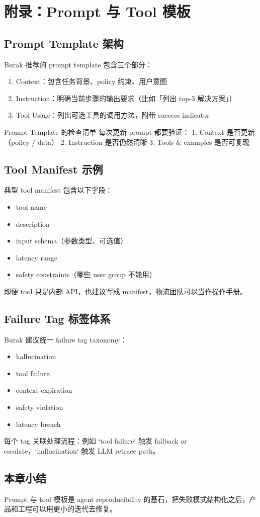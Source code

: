 \section{附录：Prompt 与 Tool 模板}

\subsection{Prompt Template 架构}

Burak 推荐的 prompt template 包含三个部分：

\begin{enumerate}
    \item Context：包含任务背景、policy 约束、用户意图
    \item Instruction：明确当前步骤的输出要求（比如「列出 top-3 解决方案」）
    \item Tool Usage：列出可选工具的调用方法，附带 success indicator
\end{enumerate}

\begin{knowledgebox}{Prompt Template 的检查清单}
每次更新 prompt 都要验证：
1. Context 是否更新（policy / data）
2. Instruction 是否仍然清晰
3. Tools \& examples 是否可复现
\end{knowledgebox}

\subsection{Tool Manifest 示例}

典型 tool manifest 包含以下字段：

\begin{itemize}
    \item tool name
    \item description
    \item input schema（参数类型、可选值）
    \item latency range
    \item safety constraints（哪些 user group 不能用）
\end{itemize}

即便 tool 只是内部 API，也建议写成 manifest，物流团队可以当作操作手册。

\subsection{Failure Tag 标签体系}

Burak 建议统一 failure tag taxonomy：

\begin{itemize}
    \item hallucination
    \item tool failure
    \item context expiration
    \item safety violation
    \item latency breach
\end{itemize}

每个 tag 关联处理流程：例如 `tool failure` 触发 fallback or escalate，`hallucination` 触发 LLM retrace path。

\subsection{本章小结}

Prompt 与 tool 模板是 agent reproducibility 的基石，把失败模式结构化之后，产品和工程可以用更小的迭代去修复。

